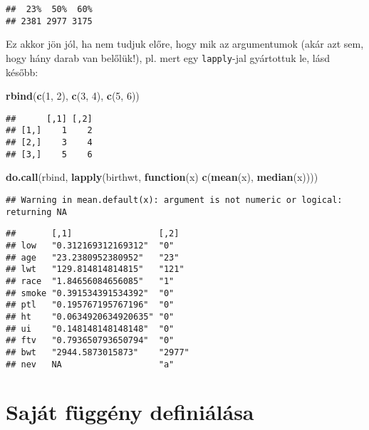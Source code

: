 \documentclass[]{book}
\newenvironment{Shaded}{\begin{snugshade}}{\end{snugshade}}
\newcommand{\ControlFlowTok}[1]{\textcolor[rgb]{0.13,0.29,0.53}{\textbf{#1}}}
\newcommand{\DecValTok}[1]{\textcolor[rgb]{0.00,0.00,0.81}{#1}}
\newcommand{\KeywordTok}[1]{\textcolor[rgb]{0.13,0.29,0.53}{\textbf{#1}}}
\newcommand{\NormalTok}[1]{#1}
\begin{document}
\begin{verbatim}
##  23%  50%  60% 
## 2381 2977 3175
\end{verbatim}

Ez akkor jön jól, ha nem tudjuk előre, hogy mik az argumentumok (akár azt sem, hogy hány darab van belőlük!), pl. mert egy \texttt{lapply}-jal gyártottuk le, lásd később:

\begin{Shaded}
\begin{Highlighting}[]
\KeywordTok{rbind}\NormalTok{(}\KeywordTok{c}\NormalTok{(}\DecValTok{1}\NormalTok{, }\DecValTok{2}\NormalTok{), }\KeywordTok{c}\NormalTok{(}\DecValTok{3}\NormalTok{, }\DecValTok{4}\NormalTok{), }\KeywordTok{c}\NormalTok{(}\DecValTok{5}\NormalTok{, }\DecValTok{6}\NormalTok{))}
\end{Highlighting}
\end{Shaded}

\begin{verbatim}
##      [,1] [,2]
## [1,]    1    2
## [2,]    3    4
## [3,]    5    6
\end{verbatim}

\begin{Shaded}
\begin{Highlighting}[]
\KeywordTok{do.call}\NormalTok{(rbind, }\KeywordTok{lapply}\NormalTok{(birthwt, }\ControlFlowTok{function}\NormalTok{(x) }\KeywordTok{c}\NormalTok{(}\KeywordTok{mean}\NormalTok{(x), }\KeywordTok{median}\NormalTok{(x))))}
\end{Highlighting}
\end{Shaded}

\begin{verbatim}
## Warning in mean.default(x): argument is not numeric or logical: returning NA
\end{verbatim}

\begin{verbatim}
##       [,1]                 [,2]  
## low   "0.312169312169312"  "0"   
## age   "23.2380952380952"   "23"  
## lwt   "129.814814814815"   "121" 
## race  "1.84656084656085"   "1"   
## smoke "0.391534391534392"  "0"   
## ptl   "0.195767195767196"  "0"   
## ht    "0.0634920634920635" "0"   
## ui    "0.148148148148148"  "0"   
## ftv   "0.793650793650794"  "0"   
## bwt   "2944.5873015873"    "2977"
## nev   NA                   "a"
\end{verbatim}

\hypertarget{sajuxe1t-fuxfcgguxe9ny-definiuxe1luxe1sa}{%
\section{Saját függény definiálása}\label{sajuxe1t-fuxfcgguxe9ny-definiuxe1luxe1sa}}
\end{document}
